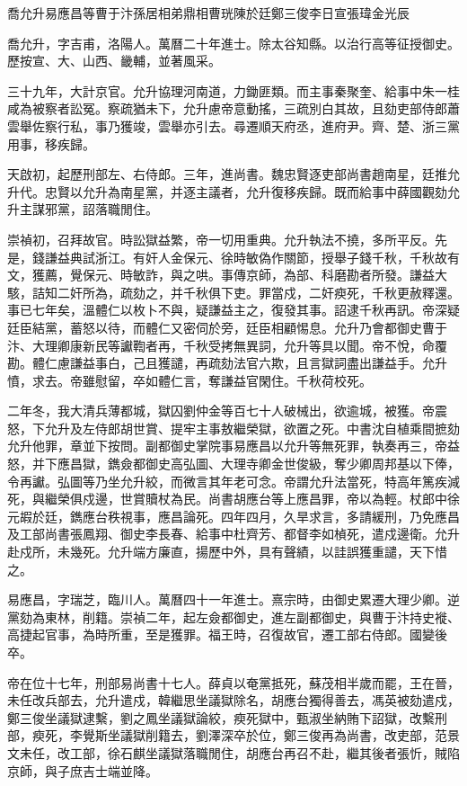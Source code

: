 
\begin{pinyinscope}
喬允升易應昌等曹于汴孫居相弟鼎相曹珖陳於廷鄭三俊李日宣張瑋金光辰

喬允升，字吉甫，洛陽人。萬曆二十年進士。除太谷知縣。以治行高等征授御史。歷按宣、大、山西、畿輔，並著風采。

三十九年，大計京官。允升協理河南道，力鋤匪類。而主事秦聚奎、給事中朱一桂咸為被察者訟冤。察疏猶未下，允升慮帝意動搖，三疏別白其故，且劾吏部侍郎蕭雲舉佐察行私，事乃獲竣，雲舉亦引去。尋遷順天府丞，進府尹。齊、楚、浙三黨用事，移疾歸。

天啟初，起歷刑部左、右侍郎。三年，進尚書。魏忠賢逐吏部尚書趙南星，廷推允升代。忠賢以允升為南星黨，并逐主議者，允升復移疾歸。既而給事中薛國觀劾允升主謀邪黨，詔落職閒住。

崇禎初，召拜故官。時訟獄益繁，帝一切用重典。允升執法不撓，多所平反。先是，錢謙益典試浙江。有奸人金保元、徐時敏偽作關節，授舉子錢千秋，千秋故有文，獲薦，覺保元、時敏詐，與之哄。事傳京師，為部、科磨勘者所發。謙益大駭，詰知二奸所為，疏劾之，并千秋俱下吏。罪當戍，二奸瘐死，千秋更赦釋還。事已七年矣，溫體仁以枚卜不與，疑謙益主之，復發其事。詔逮千秋再訊。帝深疑廷臣結黨，蓄怒以待，而體仁又密伺於旁，廷臣相顧惕息。允升乃會都御史曹于汴、大理卿康新民等讞鞫者再，千秋受拷無異詞，允升等具以聞。帝不悅，命覆勘。體仁慮謙益事白，己且獲譴，再疏劾法官六欺，且言獄詞盡出謙益手。允升憤，求去。帝雖慰留，卒如體仁言，奪謙益官閑住。千秋荷校死。

二年冬，我大清兵薄都城，獄囚劉仲金等百七十人破械出，欲逾城，被獲。帝震怒，下允升及左侍郎胡世賞、提牢主事敖繼榮獄，欲置之死。中書沈自植乘間摭劾允升他罪，章並下按問。副都御史掌院事易應昌以允升等無死罪，執奏再三，帝益怒，并下應昌獄，鐫僉都御史高弘圖、大理寺卿金世俊級，奪少卿周邦基以下俸，令再讞。弘圖等乃坐允升絞，而微言其年老可念。帝謂允升法當死，特高年篤疾減死，與繼榮俱戍邊，世賞贖杖為民。尚書胡應台等上應昌罪，帝以為輕。杖郎中徐元嘏於廷，鐫應台秩視事，應昌論死。四年四月，久旱求言，多請緩刑，乃免應昌及工部尚書張鳳翔、御史李長春、給事中杜齊芳、都督李如楨死，遣戍邊衛。允升赴戍所，未幾死。允升端方廉直，揚歷中外，具有聲績，以詿誤獲重譴，天下惜之。

易應昌，字瑞芝，臨川人。萬曆四十一年進士。熹宗時，由御史累遷大理少卿。逆黨劾為東林，削籍。崇禎二年，起左僉都御史，進左副都御史，與曹于汴持史褷、高捷起官事，為時所重，至是獲罪。福王時，召復故官，遷工部右侍郎。國變後卒。

帝在位十七年，刑部易尚書十七人。薛貞以奄黨抵死，蘇茂相半歲而罷，王在晉，未任改兵部去，允升遣戍，韓繼思坐議獄除名，胡應台獨得善去，馮英被劾遣戍，鄭三俊坐議獄逮繫，劉之鳳坐議獄論絞，瘐死獄中，甄淑坐納賄下詔獄，改繫刑部，瘐死，李覺斯坐議獄削籍去，劉澤深卒於位，鄭三俊再為尚書，改吏部，范景文未任，改工部，徐石麒坐議獄落職閒住，胡應台再召不赴，繼其後者張忻，賊陷京師，與子庶吉士端並降。


\end{pinyinscope}
